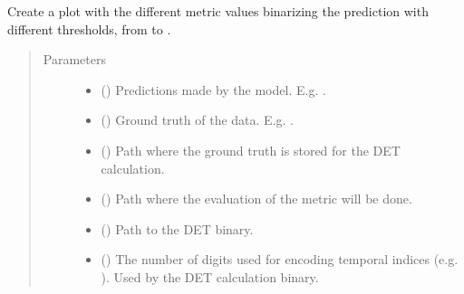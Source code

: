 \documentclass[letterpaper,10pt,english]{sphinxmanual}
\begin{document}

\begin{fulllineitems}
\label{\detokenize{utils/util:utils.util.threshold_plots}}
Create a plot with the different metric values binarizing the prediction with different thresholds, from 
to .
\begin{quote}\begin{description}
\item[{Parameters}] \leavevmode\begin{itemize}
\item {} 
 () \textendash{} Predictions made by the model. E.g. .

\item {} 
 () \textendash{} Ground truth of the data. E.g. .

\item {} 
 () \textendash{} Path where the ground truth is stored for the DET calculation.

\item {} 
 () \textendash{} Path where the evaluation of the metric will be done.

\item {} 
 () \textendash{} Path to the DET binary.

\item {} 
 () \textendash{} The number of digits used for encoding temporal indices (e.g. ). Used by the DET calculation binary.


\end{itemize}
\end{description}
\end{quote}
\end{fulllineitems}
\end{document}
